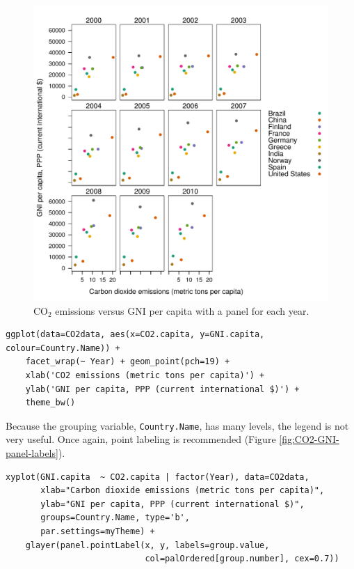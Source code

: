 \documentclass[smallroyalvopaper]{memoir}
\begin{document}
\begin{figure}[htb]
\centering
\includegraphics[width=.9\linewidth]{figs/CO2_capita_panel.pdf}
\caption{\label{fig:CO2-GNI-panel}$\mathrm{CO_2}$ emissions versus GNI per capita with a panel for each year.}
\end{figure}

\lstset{language=R,numbers=none}
\begin{lstlisting}
ggplot(data=CO2data, aes(x=CO2.capita, y=GNI.capita, colour=Country.Name)) +
    facet_wrap(~ Year) + geom_point(pch=19) + 
    xlab('CO2 emissions (metric tons per capita)') +
    ylab('GNI per capita, PPP (current international $)') +
    theme_bw()
\end{lstlisting}

Because the grouping variable, \texttt{Country.Name}, has many levels, the
legend is not very useful. Once again, point labeling is recommended
(Figure \ref{fig:CO2-GNI-panel-labels}).

\lstset{language=R,numbers=none}
\begin{lstlisting}
xyplot(GNI.capita  ~ CO2.capita | factor(Year), data=CO2data,
       xlab="Carbon dioxide emissions (metric tons per capita)",
       ylab="GNI per capita, PPP (current international $)",
       groups=Country.Name, type='b',
       par.settings=myTheme) + 
    glayer(panel.pointLabel(x, y, labels=group.value,
                            col=palOrdered[group.number], cex=0.7))
\end{lstlisting}
\end{document}
